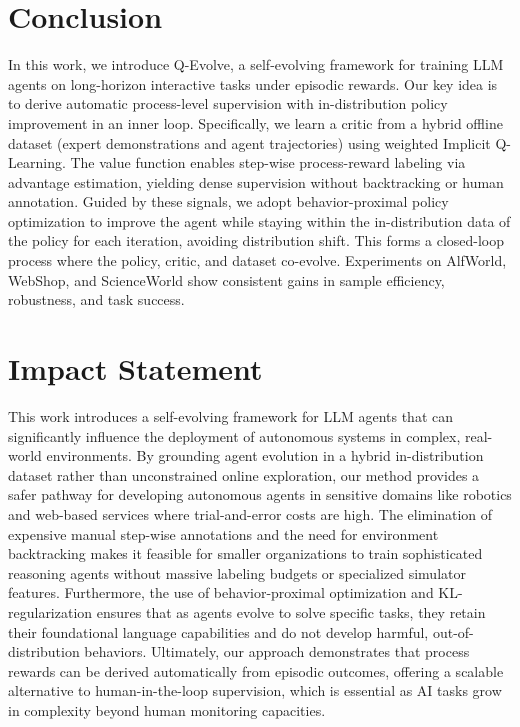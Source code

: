 \documentclass{article}
\theoremstyle{plain}
\theoremstyle{definition}
\theoremstyle{remark}
\begin{document}
\section{Conclusion}

In this work, we introduce Q-Evolve, a self-evolving framework for training LLM agents on long-horizon interactive tasks under episodic rewards. Our key idea is to derive automatic process-level supervision with in-distribution policy improvement in an inner loop. Specifically, we learn a critic from a hybrid offline dataset (expert demonstrations and agent trajectories) using weighted Implicit Q-Learning. The value function enables step-wise process-reward labeling via advantage estimation, yielding dense supervision without backtracking or human annotation. 
Guided by these signals, we adopt behavior-proximal policy optimization to improve the agent while staying within the in-distribution data of the policy for each iteration, avoiding distribution shift.
This forms a closed-loop process where the policy, critic, and dataset co-evolve. Experiments on AlfWorld, WebShop, and ScienceWorld show consistent gains in sample efficiency, robustness, and task success.

\section*{Impact Statement}
This work introduces a self-evolving framework for LLM agents that can significantly influence the deployment of autonomous systems in complex, real-world environments. 
By grounding agent evolution in a hybrid in-distribution dataset rather than unconstrained online exploration, our method provides a safer pathway for developing autonomous agents in sensitive domains
like robotics and web-based services where trial-and-error costs are high. The elimination of expensive manual step-wise annotations and the need for environment backtracking makes it feasible for smaller organizations to train sophisticated reasoning agents without massive labeling budgets or specialized simulator features. Furthermore, the use of behavior-proximal optimization and KL-regularization ensures that as agents evolve to solve specific tasks, they retain their foundational language capabilities and do not develop harmful, out-of-distribution behaviors. Ultimately, our approach demonstrates that process rewards can be derived automatically from episodic outcomes, offering a scalable alternative to human-in-the-loop supervision, which is essential as AI tasks grow in complexity beyond human monitoring capacities.




\end{document}
